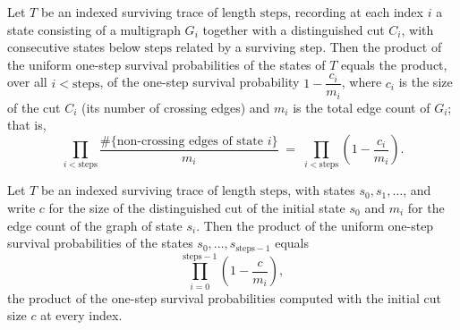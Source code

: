 \begin{lemma}
\label{KargerTrace.survivingTrace_uniform_product_eq_survival_product}
\leanok
{}
Let $T$ be an indexed surviving trace of length $\text{steps}$, recording at each index
$i$ a state consisting of a multigraph $G_i$ together with a distinguished cut $C_i$,
with consecutive states below $\text{steps}$ related by a surviving step. Then the
product of the uniform one-step survival probabilities of the states of $T$ equals the
product, over all $i < \text{steps}$, of the one-step survival probability $1 -
\dfrac{c_i}{m_i}$, where $c_i$ is the size of the cut $C_i$ (its number of crossing
edges) and $m_i$ is the total edge count of $G_i$; that is,
\[
  \prod_{i < \text{steps}} \frac{\#\{\text{non-crossing edges of state } i\}}{m_i}
  \;=\;
  \prod_{i < \text{steps}} \left(1 - \frac{c_i}{m_i}\right).
\]
\end{lemma}

\begin{lemma}
\label{KargerTrace.survivingTrace_uniform_product_eq_initial_cut_survival_product}
\leanok
{}
Let $T$ be an indexed surviving trace of length $\mathrm{steps}$, with states $s_0, s_1,
\dots$, and write $c$ for the size of the distinguished cut of the initial state $s_0$
and $m_i$ for the edge count of the graph of state $s_i$. Then the product of the
uniform one-step survival probabilities of the states $s_0, \dots, s_{\mathrm{steps}-1}$
equals
\[
  \prod_{i=0}^{\mathrm{steps}-1} \left(1 - \frac{c}{m_i}\right),
\]
the product of the one-step survival probabilities computed with the initial cut size
$c$ at every index.
\end{lemma}

